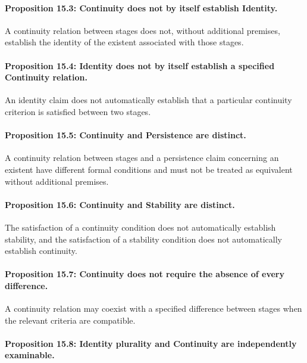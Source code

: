 \paragraph{Proposition 15.3: Continuity does not by itself establish Identity.}

A continuity relation
between stages does
not, without additional
premises, establish
the identity of the
existent associated
with those stages.

\paragraph{Proposition 15.4: Identity does not by itself establish a specified Continuity relation.}

An identity claim does
not automatically establish
that a particular
continuity criterion
is satisfied between
two stages.

\paragraph{Proposition 15.5: Continuity and Persistence are distinct.}

A continuity relation
between stages and
a persistence claim
concerning an existent
have different formal
conditions and must
not be treated as
equivalent without
additional premises.

\paragraph{Proposition 15.6: Continuity and Stability are distinct.}

The satisfaction of
a continuity condition
does not automatically
establish stability,
and the satisfaction
of a stability condition
does not automatically
establish continuity.

\paragraph{Proposition 15.7: Continuity does not require the absence of every difference.}

A continuity relation
may coexist with
a specified difference
between stages when
the relevant criteria
are compatible.

\paragraph{Proposition 15.8: Identity plurality and Continuity are independently examinable.}

